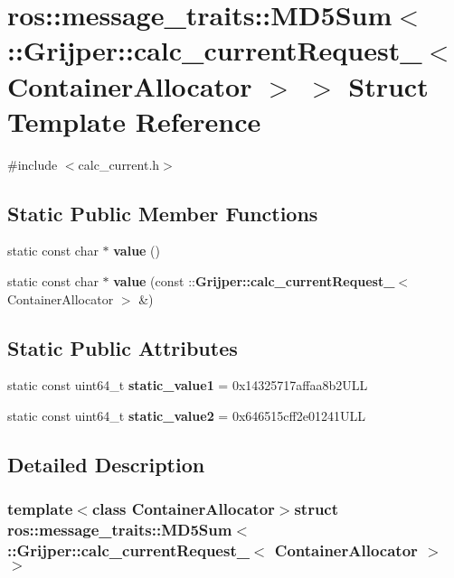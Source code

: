 \section{ros\-:\-:message\-\_\-traits\-:\-:M\-D5\-Sum$<$ \-:\-:Grijper\-:\-:calc\-\_\-current\-Request\-\_\-$<$ Container\-Allocator $>$ $>$ Struct Template Reference}
\label{structros_1_1message__traits_1_1MD5Sum_3_01_1_1Grijper_1_1calc__currentRequest___3_01ContainerAllocator_01_4_01_4}


{\ttfamily \#include $<$calc\-\_\-current.\-h$>$}

\subsection*{Static Public Member Functions}
\begin{DoxyCompactItemize}
\item 
static const char $\ast$ {\bf value} ()
\item 
static const char $\ast$ {\bf value} (const \-::{\bf Grijper\-::calc\-\_\-current\-Request\-\_\-}$<$ Container\-Allocator $>$ \&)
\end{DoxyCompactItemize}
\subsection*{Static Public Attributes}
\begin{DoxyCompactItemize}
\item 
static const uint64\-\_\-t {\bf static\-\_\-value1} = 0x14325717affaa8b2\-U\-L\-L
\item 
static const uint64\-\_\-t {\bf static\-\_\-value2} = 0x646515cff2e01241\-U\-L\-L
\end{DoxyCompactItemize}


\subsection{Detailed Description}
\subsubsection*{template$<$class Container\-Allocator$>$struct ros\-::message\-\_\-traits\-::\-M\-D5\-Sum$<$ \-::\-Grijper\-::calc\-\_\-current\-Request\-\_\-$<$ Container\-Allocator $>$ $>$}



